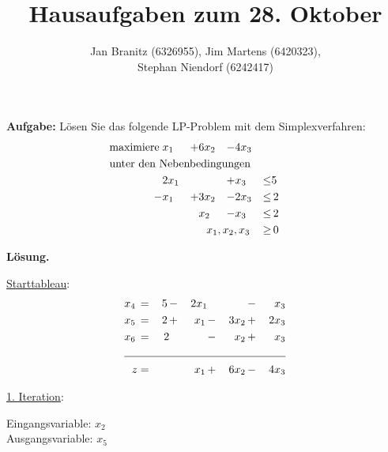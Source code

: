 \documentclass[10pt,a4paper,oneside,ngerman,numbers=noenddot]{scrartcl}
\begin{document}
\author{Jan Branitz (6326955), Jim Martens (6420323),\\
Stephan Niendorf (6242417)}
\title{Hausaufgaben zum 28. Oktober}
\maketitle
\section{} %
	\subsection{} %
		\textbf{Aufgabe:} Lösen Sie das folgende LP-Problem mit dem Simplexverfahren:
		\begin{alignat*}{4}
			\text{maximiere}\; & x_{1} &+& 6x_{2} &-& 4x_{3} && \\
			\multicolumn{8}{l}{\text{unter den Nebenbedingungen}} && \\
			\;& 2x_{1} && &+& x_{3} &\leq & 5 \\
			\;-& x_{1} &+& 3x_{2} &-& 2x_{3} &\leq &\, 2 \\
			\;& && x_{2} &-& x_{3} &\leq &\, 2 \\
			\multicolumn{6}{r}{$x_{1}, x_{2}, x_{3}$} \,&\geq &\, 0
		\end{alignat*}
		
		\textbf{Lösung.}
		
		\underline{Starttableau}:
		\begin{alignat*}{5}
			x_{4} \,&=&\, 5 \,&-&\, 2x_{1} && &-&\, x_{3} \\
			x_{5} \,&=&\, 2 \,&+&\, x_{1} \,&-&\, 3x_{2} \,&+&\, 2x_{3} \\
			x_{6} \,&=&\, 2 && &-&\, x_{2} \,&+&\, x_{3} \\ \cline{1 - 9}
			z &=& && x_{1} \,&+&\, 6x_{2} \,&-&\, 4x_{3}
		\end{alignat*}
		
		\underline{1. Iteration}:
		
		Eingangsvariable: $x_{2}$\\
		Ausgangsvariable: $x_{5}$
		
\end{document}
